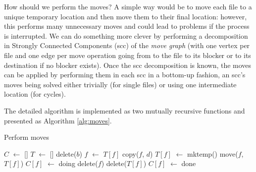 \documentclass[twoside,envcountsame,runningheads]{llncs}
\newcommand*\Let[2]{\State #1 $\gets$ #2}
\begin{document}
How should we perform the moves? A simple way would be to move each file to a unique temporary location and then move them to their final location: however, this performs many unnecessary moves and could lead to problems if the process is interrupted. We can do something more clever by performing a decomposition in Strongly Connected Components ({\sc scc}) of the \textit{move graph} (with one vertex per file and one edge per move operation going from to the file to its blocker or to its destination if no blocker exists).
Once the {\sc scc} decomposition is known, the moves can be applied by performing them in each {\sc scc} in a bottom-up fashion, an {\sc scc}'s moves being solved either trivially (for single files) or using one intermediate location (for cycles).

The detailed algorithm is implemented as two mutually recursive functions and presented as Algorithm \ref{alg:moves}.

\begin{algorithm}[t]
  \caption{Perform moves}
  \label{alg:moves}
  \begin{algorithmic}[1]
    \Statex
    \Let{$C$}{[]} 
    \Let{$T$}{[]} 
          \State delete($b$) 
        \Else
          \State {} 
        \EndIf
      \EndIf
        \Let{$f$}{$T[f]$}
      \EndIf
      \State copy($f$, $d$)
    \EndFunction
        \State \Return {}
      \EndIf
          \Let{$T[f]$}{mktemp()}
          \State move($f$, $T[f]$)
        \EndIf
        \State \Return {}
      \EndIf
      \Let{$C[f]$}{doing}
        \State {} 
      \EndFor
        \State delete($f$)
      \EndIf
        \State delete($T[f]$)
      \EndIf
      \Let{$C[f]$}{done}
    \EndFunction

      \State {}
    \EndFor
  \end{algorithmic}
\end{algorithm}
\end{document}
